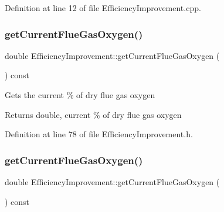 Definition at line 12 of file Efficiency\+Improvement.\+cpp.

\mbox{\label{class_efficiency_improvement_a8b66a676d696f7a9fcc8fa987371d80b}} 
\subsubsection{\texorpdfstring{get\+Current\+Flue\+Gas\+Oxygen()}{getCurrentFlueGasOxygen()}\hspace{0.1cm}{\footnotesize\ttfamily [1/3]}}
{\footnotesize\ttfamily double Efficiency\+Improvement\+::get\+Current\+Flue\+Gas\+Oxygen (\begin{DoxyParamCaption}{ }\end{DoxyParamCaption}) const\hspace{0.3cm}{\ttfamily [inline]}}

Gets the current \% of dry flue gas oxygen

\begin{DoxyReturn}{Returns}
double, current \% of dry flue gas oxygen 
\end{DoxyReturn}


Definition at line 78 of file Efficiency\+Improvement.\+h.

\mbox{\label{class_efficiency_improvement_a8b66a676d696f7a9fcc8fa987371d80b}} 
\subsubsection{\texorpdfstring{get\+Current\+Flue\+Gas\+Oxygen()}{getCurrentFlueGasOxygen()}\hspace{0.1cm}{\footnotesize\ttfamily [2/3]}}
{\footnotesize\ttfamily double Efficiency\+Improvement\+::get\+Current\+Flue\+Gas\+Oxygen (\begin{DoxyParamCaption}{ }\end{DoxyParamCaption}) const\hspace{0.3cm}{\ttfamily [inline]}}

